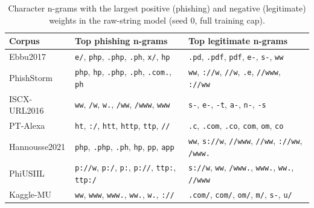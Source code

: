 \begin{table}[tp]
\centering
\caption{Character n-grams with the largest positive (phishing) and negative (legitimate) weights in the raw-string model (seed 0, full training cap).}
\label{tab:ngrams}
\footnotesize
\begin{tabularx}{\linewidth}{@{}lXX@{}}
\toprule
Corpus & Top phishing n-grams & Top legitimate n-grams \\
\midrule
Ebbu2017 & \texttt{e/}, \texttt{php}, \texttt{.php}, \texttt{.ph}, \texttt{x/}, \texttt{hp} & \texttt{.pd}, \texttt{.pdf}, \texttt{pdf}, \texttt{e-}, \texttt{s-}, \texttt{ww} \\
PhishStorm & \texttt{php}, \texttt{hp}, \texttt{.php}, \texttt{.ph}, \texttt{.com.}, \texttt{ph} & \texttt{ww}, \texttt{://w}, \texttt{//w}, \texttt{.e}, \texttt{//www}, \texttt{://ww} \\
ISCX-URL2016 & \texttt{ww}, \texttt{/w}, \texttt{w.}, \texttt{/ww}, \texttt{/www}, \texttt{www} & \texttt{s-}, \texttt{e-}, \texttt{-t}, \texttt{a-}, \texttt{n-}, \texttt{-s} \\
PT-Alexa & \texttt{ht}, \texttt{:/}, \texttt{htt}, \texttt{http}, \texttt{ttp}, \texttt{//} & \texttt{.c}, \texttt{.com}, \texttt{.co}, \texttt{com}, \texttt{om}, \texttt{co} \\
Hannousse2021 & \texttt{php}, \texttt{.php}, \texttt{.ph}, \texttt{hp}, \texttt{pp}, \texttt{app} & \texttt{ww}, \texttt{s://w}, \texttt{//www}, \texttt{//ww}, \texttt{://ww}, \texttt{/www.} \\
PhiUSIIL & \texttt{p://w}, \texttt{p:/}, \texttt{p:}, \texttt{p://}, \texttt{ttp:}, \texttt{ttp:/} & \texttt{s://w}, \texttt{ww}, \texttt{/www.}, \texttt{www.}, \texttt{ww.}, \texttt{//www} \\
Kaggle-MU & \texttt{ww}, \texttt{www}, \texttt{www.}, \texttt{ww.}, \texttt{w.}, \texttt{://} & \texttt{.com/}, \texttt{com/}, \texttt{om/}, \texttt{m/}, \texttt{s-}, \texttt{u/} \\
\bottomrule
\end{tabularx}
\end{table}
